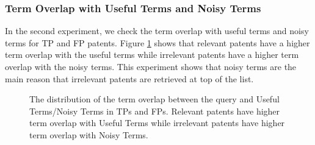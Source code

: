 \subsubsection{Term Overlap with Useful Terms and Noisy Terms}
In the second experiment, we check the term overlap with useful terms and noisy terms for TP and FP patents. Figure \ref{fig:usefulnoisy} shows that relevant patents have a higher term overlap with the useful terms while irrelevant patents have a higher term overlap with the noisy terms. This experiment shows that noisy terms are the main reason that irrelevant patents are retrieved at top of the list. 
\begin{figure}[t!]
\begin{centering}
 \hspace*{1.5cm}  
\par\end{centering} 

\protect\caption{The distribution of the term overlap between the query and Useful Terms/Noisy Terms in TPs and FPs. Relevant patents have higher term overlap with Useful Terms while irrelevant patents have higher term overlap with Noisy Terms.}
\label{fig:usefulnoisy}
\end{figure}
